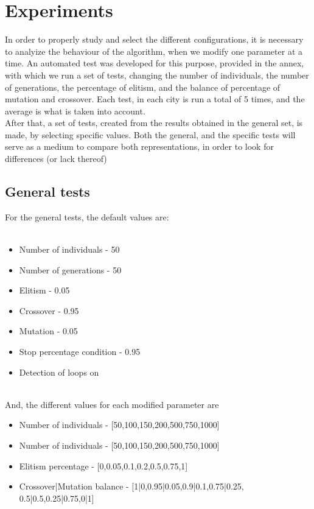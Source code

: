 \section{Experiments}

In order to properly study and select the different configurations, it is
necessary to analyize the behaviour of the algorithm, when we modify one
parameter at a
time. An automated test was developed for this purpose, provided in the annex,
with which we run a set of tests, changing the number of individuals, the number of
generations, the percentage of elitism, and the balance of percentage of
mutation and crossover. Each test, in each city is run a total of 5 times,
and the average is what is taken into account. \\
After that, a set of tests, created from the results obtained in the general
set, is made, by selecting specific values. Both the general, and the specific
tests will serve as a medium to compare both representations, in order to look
for differences (or lack thereof)
\\
\subsection{General tests}
For the general tests, the default values are:\\
\\
\begin{itemize}
  \item Number of individuals - 50
  \item Number of generations - 50
  \item Elitism - 0.05
  \item Crossover - 0.95
  \item Mutation - 0.05
  \item Stop percentage condition - 0.95
  \item Detection of loops on
\end{itemize}
\\
And, the different values for each modified parameter are
\begin{itemize}
  \item Number of individuals - [50,100,150,200,500,750,1000]\\
  \item Number of individuals - [50,100,150,200,500,750,1000]\\
  \item Elitism percentage - [0,0.05,0.1,0.2,0.5,0.75,1]\\
  \item Crossover|Mutation balance - [1|0,0.95|0.05,0.9|0.1,0.75|0.25,
0.5|0.5,0.25|0.75,0|1]\\
\end {itemize}
